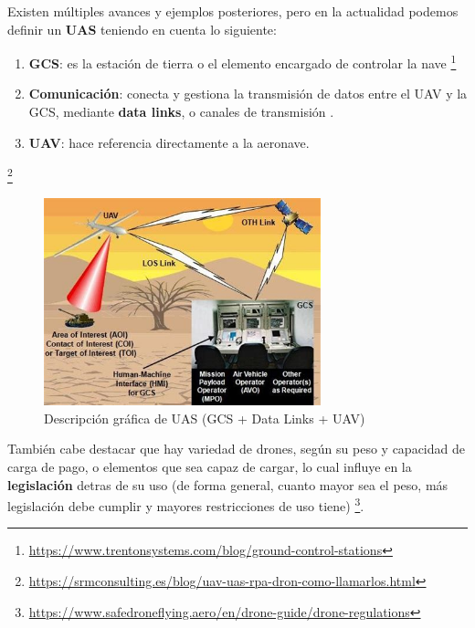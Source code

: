 Existen múltiples avances y ejemplos posteriores, pero en la actualidad podemos definir un \textbf{\ac{UAS}} teniendo en cuenta lo siguiente:

\begin{enumerate}
	\item \textbf{\ac{GCS}}: es la estación de tierra o el elemento encargado de controlar la nave \footnote[10]{\url{https://www.trentonsystems.com/blog/ground-control-stations}}

	\item \textbf{Comunicación}: conecta y gestiona la transmisión de datos entre el \ac{UAV} y la \ac{GCS}, mediante \textbf{data links}, o canales de transmisión \cite{data-link-definicion}.
	
    \item \textbf{\ac{UAV}}: hace referencia directamente a la aeronave.
\end{enumerate} \footnote[11]{\url{https://srmconsulting.es/blog/uav-uas-rpa-dron-como-llamarlos.html}}

\begin{figure} [H]
	\begin{center}
	\includegraphics[height=6cm]{imagenes/cap1/7_drone_components.jpeg}
	\end{center}
	\caption[Descripción gráfica de \ac{UAS} (GCS + Data Links + UAV)]{Descripción gráfica de \ac{UAS} (GCS + Data Links + UAV)}
	\label{fig:drone_components}
\end{figure}

También cabe destacar que hay variedad de drones, según su peso y capacidad de carga de pago, o elementos que sea capaz de cargar, lo cual influye en la \textbf{legislación} detras de su uso (de forma general, cuanto mayor sea el peso, más legislación debe cumplir y mayores restricciones de uso tiene) \footnote[12]{\url{https://www.safedroneflying.aero/en/drone-guide/drone-regulations}}.\\

